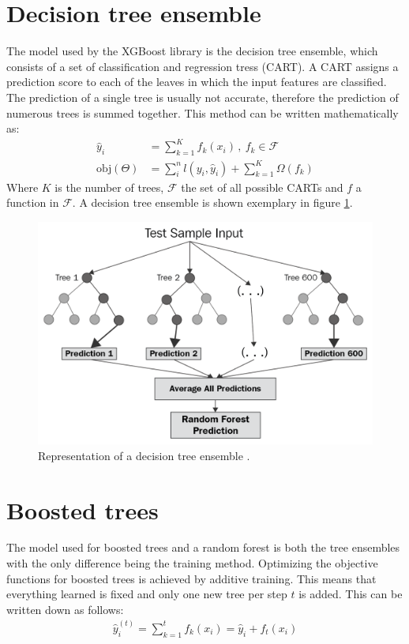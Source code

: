 \section{Decision tree ensemble}
The model used by the XGBoost library is the decision tree ensemble, which consists of a set of classification and regression tress (CART).
A CART assigns a prediction score to each of the leaves in which the input features are classified. The prediction of a single tree is usually not accurate,
therefore the prediction of numerous trees is summed together. This method can be written mathematically as:
\begin{align}
  \hat{y}_i &= \sum_{k=1}^K f_k(x_i)\,, \: f_k \in \mathcal{F} \\
  \text{obj}(\Theta) &= \sum_i^n l(y_i, \hat{y}_i) + \sum_{k=1}^K \Omega(f_k)
\end{align}
Where $K$ is the number of trees, $\mathcal{F}$ the set of all possible CARTs and $f$ a function in $\mathcal{F}$. A decision tree ensemble is shown exemplary in
figure \ref{fig:random_forest}.

\begin{figure}
  \centering
  \includegraphics[height=0.6\textwidth]{images/random_forest.png}
  \caption{Representation of a decision tree ensemble \cite{random_forest}.}
  \label{fig:random_forest}
\end{figure}

\section{Boosted trees}
The model used for boosted trees and a random forest is both the tree ensembles with the only difference being the training method. Optimizing the objective functions for
boosted trees is achieved by additive training. This means that everything learned is fixed and only one new tree per step $t$ is added. This can be written
down as follows:
\begin{align}
  \hat{y}_i^{(t)} = \sum_{k=1}^t f_k(x_i) = \hat{y}_i + f_t(x_i)
\end{align}

